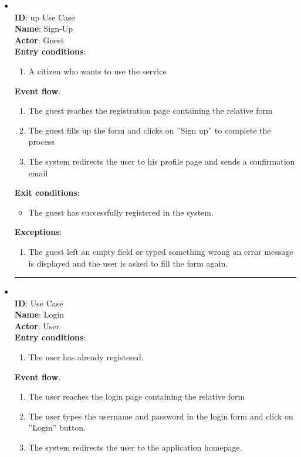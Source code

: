 \begin{enumerate}
\begin{itemize}
		\item{  } \\
		\textbf{ID}: \Sign up Use Case  \\
		\textbf{Name}: Sign-Up \\
		\textbf{Actor}: Guest \\
		\textbf{Entry conditions}:
		\begin{enumerate}
			\item{A citizen who wants to use the service}
		\end{enumerate}
		\textbf{Event flow}:
		\begin{enumerate}
			\item{The guest reaches the registration page containing the relative form}
			\item{The guest ﬁlls up the form and clicks on ”Sign up” to complete the process}
			\item{The system redirects the user to his proﬁle page and sends a conﬁrmation email}

		\end{enumerate}
		\textbf{Exit conditions}:
		\begin{itemize}
			\item{The guest has successfully registered in the system.}
		\end{itemize}
		\textbf{Exceptions}:
		\begin{enumerate}
      		\item{The guest left an empty ﬁeld or typed something wrong an error message is displayed and the user is asked to ﬁll the form again.}
 		   \end{enumerate}
		\rule{\linewidth}{0.4pt}
    		\item{  } \\
		\textbf{ID}: \Login Use Case  \\
		\textbf{Name}: Login \\
		\textbf{Actor}: User \\
		\textbf{Entry conditions}:
		\begin{enumerate}
			\item{The user has already registered.}
		\end{enumerate}
		\textbf{Event flow}:
		\begin{enumerate}
			\item{The user reaches the login page containing the relative form}
			\item{The user types the username and password in the login form and click on ”Login” button.}
			\item{The system redirects the user to the application homepage.}


\end{enumerate}
\end{itemize}
\end{enumerate}
